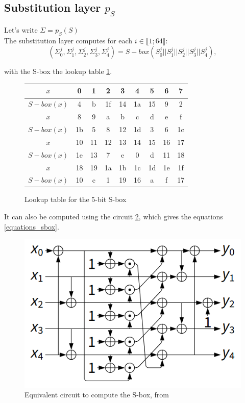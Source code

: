 \documentclass[a4paper,11pt,twocolumn]{article}
\begin{document}
	\subsection{Substitution layer $p_S$}
	Let's write $\Sigma=p_S(S)$\\
	The substitution layer computes for each $i \in \llbracket 1;64 \rrbracket$:
	$$(\Sigma_0^j,\Sigma_1^j,\Sigma_2^j,\Sigma_3^j,\Sigma_4^j) = S-box(S_0^j||S_1^j||S_2^j||S_3^j||S_4^j),$$
	
	with the S-box the lookup table \ref{lookup_sbox}.
	
	\begin{figure}[h]
		\small
		\centering
		\begin{tabular}{|c||*{8}{c|}}
			\hline
			$x$&0&1&2&3&4&5&6&7\\
			\hline
			$S-box(x)$&4&b&1f&14&1a&15&9&2\\
			\hline\hline
			$x$&8&9&a&b&c&d&e&f\\
			\hline
			$S-box(x)$&1b&5&8&12&1d&3&6&1c\\
			\hline\hline
			$x$&10&11&12&13&14&15&16&17\\
			\hline
			$S-box(x)$&1e&13&7&e&0&d&11&18\\
			\hline\hline
			$x$&18&19&1a&1b&1c&1d&1e&1f\\
			\hline
			$S-box(x)$&10&c&1&19&16&a&f&17\\
			\hline
		\end{tabular}
		\caption{Lookup table for the 5-bit S-box}
		\label{lookup_sbox}
	\end{figure}
	
	It can also be computed using the circuit \ref{circuit_sbox}, which gives the equations \ref{equations_sbox}.
	
	\begin{figure}[H]
		\centering
		\includegraphics[scale=0.4]{circuit}
		\caption{Equivalent circuit to compute the S-box, from \cite{norme}}
		\label{circuit_sbox}
	\end{figure}
	
\end{document}
